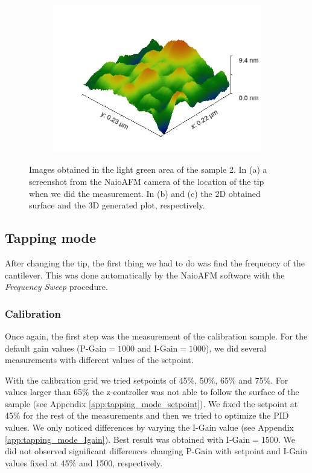 \documentclass[11pt,a4paper]{article}
\begin{document}
\begin{figure}[H]
\begin{subfigure}[b]{0.45\textwidth}
\caption{}
\end{subfigure}
\begin{subfigure}[b]{0.45\textwidth}
\includegraphics[width=\textwidth]{sm_sample3_3D_improved}
\caption{}
\end{subfigure}
\caption{Images obtained in the light green area of the sample 2. In (a) a screenshot from the NaioAFM camera of the location of the tip when we did the measurement. In (b) and (c) the 2D obtained surface and the 3D generated plot, respectively.}
\label{fig:sample3_light_green}
\end{figure}

\newpage
\subsection{Tapping mode}
After changing the tip, the first thing we had to do was find the frequency of the cantilever. This was done automatically by the NaioAFM software with the \emph{Frequency Sweep} procedure.

\subsubsection{Calibration}
Once again, the first step was the measurement of the calibration sample. For the default gain values ($\text{P-Gain}=1000$ and $\text{I-Gain}=1000$), we did several measurements with different values of the setpoint.

With the calibration grid we tried setpoints of 45\%, 50\%, 65\% and 75\%. For values larger than 65\% the z-controller was not able to follow the surface of the sample (see Appendix \ref{app:tapping_mode_setpoint}). We fixed the setpoint at 45\% for the rest of the measurements and then we tried to optimize the PID values. We only noticed differences by varying the I-Gain value (see Appendix \ref{app:tapping_mode_Igain}). Best result was obtained with $\text{I-Gain}=1500$. We did not observed significant differences changing P-Gain with setpoint and I-Gain values fixed at 45\% and 1500, respectively.
\end{document}
